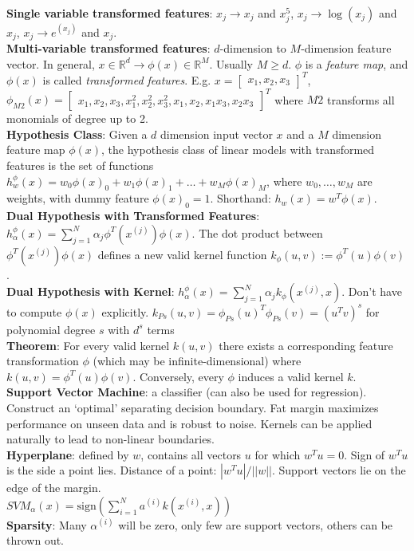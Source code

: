 \documentclass{article}
\begin{document}
{\begin{multicols*}{3}
\textbf{Single variable transformed features}: $x_j\to x_j$ and $x_j^5$, $x_j\to \log(x_j)$ and $x_j$, $x_j\to e^{(x_j)}$ and $x_j$. \\
\textbf{Multi-variable transformed features}: $d$-dimension to $M$-dimension feature vector. In general, $x\in \mathbb{R}^d\to\phi(x)\in \mathbb{R}^M$. Usually $M\geq d$. $\phi$ is a \textit{feature map}, and $\phi(x)$ is called \textit{transformed features}. E.g. $x=\begin{bmatrix}x_1,x_2,x_3\end{bmatrix}^T$,$\phi_{M2}(x)=\begin{bmatrix}x_1,x_2,x_3,x_1^2,x_2^2,x_3^2,x_1,x_2,x_1x_3,x_2x_3\end{bmatrix}^T$ where $M2$ transforms all monomials of degree up to 2.\\
\textbf{Hypothesis Class}: Given a $d$ dimension input vector $x$ and a $M$ dimension feature map $\phi(x)$, the hypothesis class of linear models with transformed features is the set of functions $h_w^\phi(x)=w_0\phi(x)_0+w_1\phi(x)_1+\dots+w_M\phi(x)_M$, where $w_0,\dots,w_M$ are weights, with dummy feature $\phi(x)_0=1$. Shorthand: $h_w(x)=w^T\phi(x)$. \\
\textbf{Dual Hypothesis with Transformed Features}: $h_\alpha^\phi(x)=\sum^N_{j=1}\alpha_j\phi^T(x^{(j)})\phi(x)$. The dot product between $\phi^T(x^{(j)})\phi(x)$ defines a new valid kernel function $k_\phi(u,v):=\phi^T(u)\phi(v)$.\\
\textbf{Dual Hypothesis with Kernel}: $h_\alpha^\phi(x)=\sum^N_{j=1}\alpha_jk_\phi(x^{(j)},x)$. Don't have to compute $\phi(x)$ explicitly. $k_{Ps}(u,v)=\phi_{Ps}(u)^T\phi_{Ps}(v)=(u^Tv)^s$ for polynomial degree $s$ with $d^s$ terms\\
\textbf{Theorem}: For every valid kernel $k(u,v)$ there exists a corresponding feature transformation $\phi$ (which may be infinite-dimensional) where $k(u,v)=\phi^T(u)\phi(v)$. Conversely, every $\phi$ induces a valid kernel $k$.\\
\textbf{Support Vector Machine}: a classifier (can also be used for regression). Construct an `optimal' separating decision boundary. Fat margin maximizes performance on unseen data and is robust to noise. Kernels can be applied naturally to lead to non-linear boundaries. \\
\textbf{Hyperplane}: defined by $w$, contains all vectors $u$ for which $w^Tu=0$. Sign of $w^Tu$ is the side a point lies. Distance of a point: $|w^Tu|/||w||$. Support vectors lie on the edge of the margin.\\
$SVM_\alpha(x)=\text{sign}(\sum_{i=1}^Na^{(i)}k(x^{(i)},x))$ \\
\textbf{Sparsity}: Many $\alpha^{(i)}$ will be zero, only few are support vectors, others can be thrown out. 

\end{multicols*}}
\end{document}
